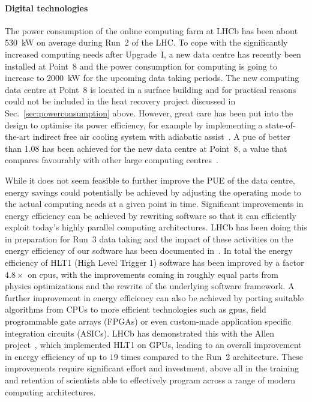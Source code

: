 \documentclass[../SustainableHEP.tex]{subfiles}
\begin{document}
\begin{casestudy}
\paragraph{Digital technologies}
The power consumption of the online computing farm at LHCb has been about 530~kW on average during Run~2 of the LHC. To cope with the significantly increased computing needs after Upgrade~I, a new data centre has recently been installed at Point~8 and the power consumption for computing is going to increase to 2000~kW for the upcoming data taking periods. 
The new computing data centre at Point~8 is located in a surface building and for practical reasons could not be included in the heat recovery project discussed in Sec.~\ref{sec:powerconsumption} above. However, great care has been put into the design to optimise its power efficiency, for example by implementing a state-of-the-art indirect free air cooling system with adiabatic assist~\cite{lbldcreport}.
A \acrshort{pue} of better than 1.08 has been achieved for the new data centre at Point~8, a value that compares favourably with other large computing centres~\cite{pue-data}. 

While it does not seem feasible to further improve the PUE of the data centre, energy savings could potentially be achieved by adjusting the operating mode to the actual computing needs at a given point in time.  Significant improvements in energy efficiency can be achieved by rewriting software so that it can efficiently exploit today's highly parallel computing architectures. LHCb has been doing this in preparation for Run~3 data taking and the impact of these activities on the energy efficiency of our software has been documented in~\cite{hlt1-energy-eff}. In total the energy efficiency of HLT1 (High Level Trigger 1) software has been improved by a factor $4.8\times$ on \acrshort{cpu}s, with the improvements coming in roughly equal parts from physics optimizations and the rewrite of the underlying software framework. A further improvement in energy efficiency  can also be achieved by porting suitable algorithms from CPUs to more efficient technologies such as \acrshort{gpu}s, field programmable gate arrays (FPGAs) or even custom-made application specific integration circuits (ASICs). LHCb has demonstrated this with the Allen project~\cite{Allen}, which implemented HLT1 on GPUs, leading to an overall improvement in energy efficiency of up to $19$ times compared to the Run~2 architecture. These improvements require significant effort and investment, above all in the training and retention of scientists able to effectively program across a range of modern computing architectures. 


\end{casestudy}
\end{document}
